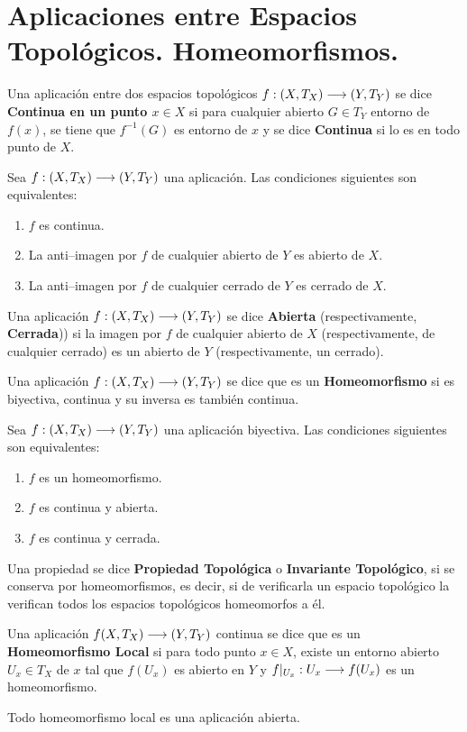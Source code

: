 \documentclass[cursovd_portada.tex]{subfiles}
\begin{document}
\section{Aplicaciones entre Espacios Topológicos. Ho\-meo\-mor\-fis\-mos.}
\begin{defi}
Una aplicación entre dos espacios topológicos $f:(X,T_X)\longrightarrow (Y,T_Y)$ se dice {\bf Continua en un punto $x\in X$}
si para cualquier abierto $G\in T_Y$ entorno de $f(x)$, se tiene que $f^{-1}(G)$ es entorno de $x$ y se dice {\bf
Continua} si lo es en todo punto de $X$.
\end{defi}
\begin{teorema}
Sea $f:(X,T_X)\longrightarrow (Y,T_Y)$ una aplicación. Las condiciones siguientes son equivalentes:
\begin{enumerate}
\item $f$ es continua.
\item La anti--imagen por $f$ de cualquier abierto de $Y$ es abierto de $X$.
\item La anti--imagen por $f$ de cualquier cerrado de $Y$ es cerrado de $X$.
\end{enumerate}
\end{teorema}
\begin{defi}
Una aplicación $f:(X,T_X)\longrightarrow (Y,T_Y)$ se dice {\bf Abierta} (respectivamente, {\bf Cerrada})) si la imagen por $f$
de cualquier abierto de $X$ (respectivamente, de cualquier cerrado) es un abierto de $Y$ (respectivamente, un
cerrado).
\end{defi}
\begin{defi} Una aplicación $f:(X,T_X)\longrightarrow (Y,T_Y)$ se dice que es un {\bf Homeomorfismo} si es biyectiva, continua
y su inversa es también continua.
\end{defi}
\begin{teorema}
Sea $f:(X,T_X)\longrightarrow (Y,T_Y)$ una aplicación biyectiva. Las condiciones siguientes son equivalentes:
\begin{enumerate}
\item $f$ es un homeomorfismo.
\item $f$ es continua y abierta.
\item $f$ es continua y cerrada.
\end{enumerate}
\end{teorema}
\begin{defi} Una propiedad se dice {\bf Propiedad Topológica} o {\bf Invariante Topológico}, si se conserva por
homeomorfismos, es decir, si de verificarla un espacio topológico la verifican todos los espacios topológicos
homeomorfos a él.
\end{defi}
\begin{defi}
Una aplicación $f(X,T_X)\longrightarrow (Y,T_Y)$ continua se dice que es un {\bf Homeomorfismo Local} si para todo punto $x\in
X$, existe un entorno abierto $U_x\in T_X$ de $x$ tal que $f(U_x)$ es abierto en $Y$ y $f|_{U_x}:U_x\longrightarrow f(U_x)$ es
un homeomorfismo.
\end{defi}
\begin{prop}
Todo homeomorfismo local es una aplicación abierta.
\end{prop}
\end{document}
